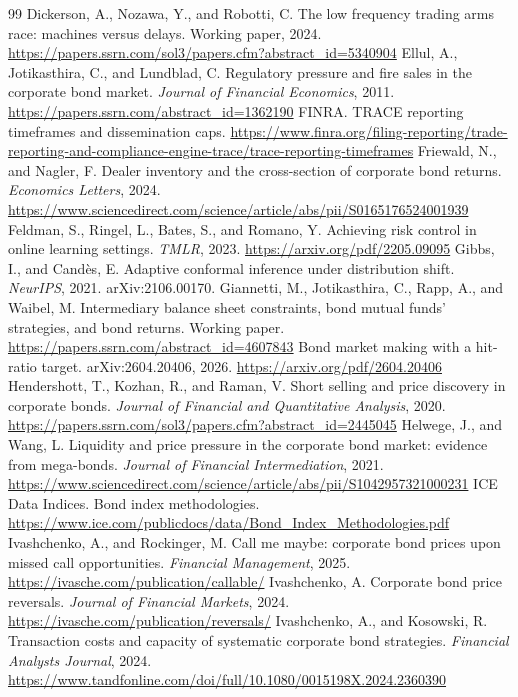 \documentclass[11pt,letterpaper]{article}
\begin{document}
\begin{thebibliography}{99}
 Dickerson, A., Nozawa, Y., and Robotti, C. The low frequency trading arms race: machines versus delays. Working paper, 2024. \url{https://papers.ssrn.com/sol3/papers.cfm?abstract_id=5340904}
 Ellul, A., Jotikasthira, C., and Lundblad, C. Regulatory pressure and fire sales in the corporate bond market. \emph{Journal of Financial Economics}, 2011. \url{https://papers.ssrn.com/abstract_id=1362190}
 FINRA. TRACE reporting timeframes and dissemination caps. \url{https://www.finra.org/filing-reporting/trade-reporting-and-compliance-engine-trace/trace-reporting-timeframes}
 Friewald, N., and Nagler, F. Dealer inventory and the cross-section of corporate bond returns. \emph{Economics Letters}, 2024. \url{https://www.sciencedirect.com/science/article/abs/pii/S0165176524001939}
 Feldman, S., Ringel, L., Bates, S., and Romano, Y. Achieving risk control in online learning settings. \emph{TMLR}, 2023. \url{https://arxiv.org/pdf/2205.09095}
 Gibbs, I., and Cand\`es, E. Adaptive conformal inference under distribution shift. \emph{NeurIPS}, 2021. arXiv:2106.00170.
 Giannetti, M., Jotikasthira, C., Rapp, A., and Waibel, M. Intermediary balance sheet constraints, bond mutual funds' strategies, and bond returns. Working paper. \url{https://papers.ssrn.com/abstract_id=4607843}
 Bond market making with a hit-ratio target. arXiv:2604.20406, 2026. \url{https://arxiv.org/pdf/2604.20406}
 Hendershott, T., Kozhan, R., and Raman, V. Short selling and price discovery in corporate bonds. \emph{Journal of Financial and Quantitative Analysis}, 2020. \url{https://papers.ssrn.com/sol3/papers.cfm?abstract_id=2445045}
 Helwege, J., and Wang, L. Liquidity and price pressure in the corporate bond market: evidence from mega-bonds. \emph{Journal of Financial Intermediation}, 2021. \url{https://www.sciencedirect.com/science/article/abs/pii/S1042957321000231}
 ICE Data Indices. Bond index methodologies. \url{https://www.ice.com/publicdocs/data/Bond_Index_Methodologies.pdf}
 Ivashchenko, A., and Rockinger, M. Call me maybe: corporate bond prices upon missed call opportunities. \emph{Financial Management}, 2025. \url{https://ivasche.com/publication/callable/}
 Ivashchenko, A. Corporate bond price reversals. \emph{Journal of Financial Markets}, 2024. \url{https://ivasche.com/publication/reversals/}
 Ivashchenko, A., and Kosowski, R. Transaction costs and capacity of systematic corporate bond strategies. \emph{Financial Analysts Journal}, 2024. \url{https://www.tandfonline.com/doi/full/10.1080/0015198X.2024.2360390}

\end{thebibliography}
\end{document}

